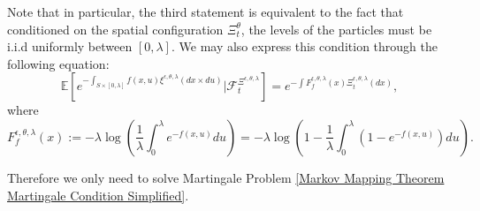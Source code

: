 \documentclass[12pt]{article}
\begin{document}
Note that in particular, the third statement is equivalent to the fact that conditioned on the spatial configuration $\Xi^{\theta}_t$, the levels of the particles must be i.i.d uniformly between $[0,\lambda]$. We may also express this condition through the following equation:
\begin{equation}\label{Markov Mapping Theorem Cox Condition}
\mathbb{E}\left[e^{-\int_{S \times [0,\lambda]} f(x,u) \xi^{\epsilon,\theta,\lambda}(dx \times du)}\bigg| \mathcal{F}^{\Xi^{\epsilon,\theta, \lambda}}_t\right]=e^{-\int F^{\epsilon,\theta,\lambda}_f(x) \Xi^{\epsilon,\theta,\lambda}_t(dx)},
\end{equation}
where 
$$F^{\epsilon,\theta,\lambda}_f(x):=-\lambda\log \left(\frac{1}{\lambda}\int_{0}^{\lambda}e^{-f(x,u)}du\right)=-\lambda\log \left(1-\frac{1}{\lambda}\int_{0}^{\lambda}(1-e^{-f(x,u)})du\right).$$

Therefore we only need to solve Martingale Problem \eqref{Markov Mapping Theorem Martingale Condition Simplified}.\\
\end{document}
